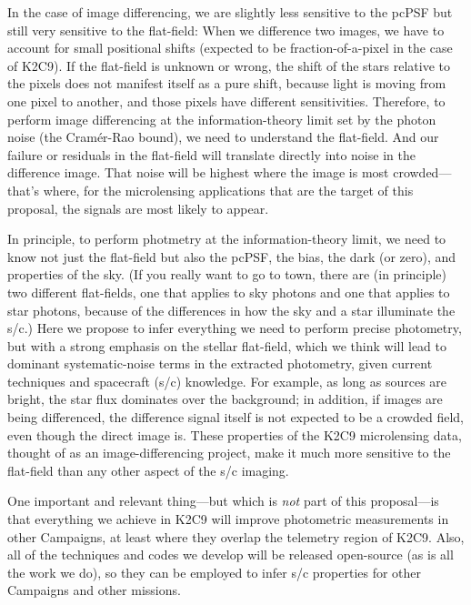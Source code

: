 \documentclass[12pt,preprint]{aastex}
\begin{document}
In the case of image differencing, we are slightly less sensitive to the
pcPSF but still very sensitive to the flat-field:
When we difference two images, we have to account for small positional
shifts (expected to be fraction-of-a-pixel in the case of K2C9).
If the flat-field is unknown or wrong, the shift of the stars relative
to the pixels does not manifest itself as a pure shift, because light
is moving from one pixel to another, and those pixels have different
sensitivities.
Therefore, to perform image differencing at the information-theory
limit set by the photon noise (the Cram\'er-Rao bound), we need to
understand the flat-field.
And our failure or residuals in the flat-field will translate directly
into noise in the difference image.
That noise will be highest where the image is most crowded---that's where, for
the microlensing applications that are the target of this proposal,
the signals are most likely to appear.

In principle, to perform photmetry at the information-theory limit,
we need to know not just the flat-field but also the pcPSF, the bias,
the dark (or zero), and properties of the sky.
(If you really want to go to town, there are (in principle) two different
flat-fields, one that applies to sky photons and one that applies to star photons,
because of the differences in how the sky and a star illuminate the
s/c.)
Here we propose to infer everything we need to perform precise
photometry, but with a strong emphasis on the stellar flat-field, which we
think will lead to dominant systematic-noise terms in the extracted
photometry, given current techniques and spacecraft (s/c) knowledge.
For example, as long as sources are bright, the star flux dominates
over the background; in addition, if images are being differenced, the
difference signal itself is not expected to be a crowded field, even though
the direct image is.
These properties of the K2C9 microlensing data, thought of as an
image-differencing project, make it much more sensitive to the flat-field than
any other aspect of the s/c imaging.

One important and relevant thing---but which is \emph{not} part of this
proposal---is that everything we achieve in K2C9 will improve photometric
measurements in other Campaigns, at least where they overlap the
telemetry region of K2C9.
Also, all of the techniques and codes we develop will be released
open-source (as is all the work we do), so they can be employed to
infer s/c properties for other Campaigns and other missions.
\end{document}
